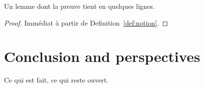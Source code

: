 \documentclass[a4paper,USenglish]{lipics-v2021}
\begin{document}
\begin{lemma}
\label{lem:short}
Un lemme dont la preuve tient en quelques lignes.
\end{lemma}
\begin{proof}
Immédiat à partir de Definition~\ref{def:notion}.
\end{proof}

\section{Conclusion and perspectives}
\label{sec:conclusion}

Ce qui est fait, ce qui reste ouvert.



\end{document}
